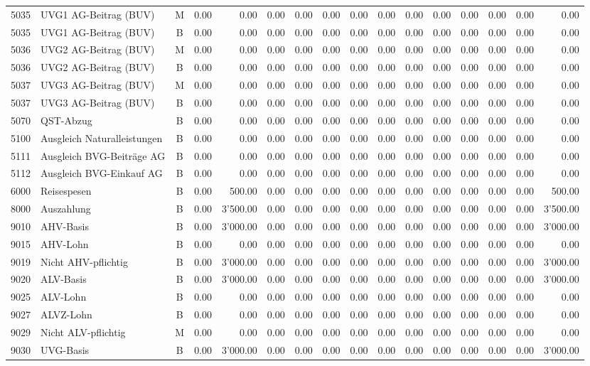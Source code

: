 \documentclass[8pt,a4paper]{extarticle}
\begin{document}
\begin{longtable}{@{\extracolsep{\fill}} l l c r r r r r r r r r r r r r}
5035&UVG1 AG-Beitrag (BUV)&M&0.00&0.00&0.00&0.00&0.00&0.00&0.00&0.00&0.00&0.00&0.00&0.00&0.00\\
5035&UVG1 AG-Beitrag (BUV)&B&0.00&0.00&0.00&0.00&0.00&0.00&0.00&0.00&0.00&0.00&0.00&0.00&0.00\\
5036&UVG2 AG-Beitrag (BUV)&M&0.00&0.00&0.00&0.00&0.00&0.00&0.00&0.00&0.00&0.00&0.00&0.00&0.00\\
5036&UVG2 AG-Beitrag (BUV)&B&0.00&0.00&0.00&0.00&0.00&0.00&0.00&0.00&0.00&0.00&0.00&0.00&0.00\\
5037&UVG3 AG-Beitrag (BUV)&M&0.00&0.00&0.00&0.00&0.00&0.00&0.00&0.00&0.00&0.00&0.00&0.00&0.00\\
5037&UVG3 AG-Beitrag (BUV)&B&0.00&0.00&0.00&0.00&0.00&0.00&0.00&0.00&0.00&0.00&0.00&0.00&0.00\\
5070&QST-Abzug&B&0.00&0.00&0.00&0.00&0.00&0.00&0.00&0.00&0.00&0.00&0.00&0.00&0.00\\
5100&Ausgleich Naturalleistungen&B&0.00&0.00&0.00&0.00&0.00&0.00&0.00&0.00&0.00&0.00&0.00&0.00&0.00\\
5111&Ausgleich BVG-Beiträge AG&B&0.00&0.00&0.00&0.00&0.00&0.00&0.00&0.00&0.00&0.00&0.00&0.00&0.00\\
5112&Ausgleich BVG-Einkauf AG&B&0.00&0.00&0.00&0.00&0.00&0.00&0.00&0.00&0.00&0.00&0.00&0.00&0.00\\
6000&Reisespesen&B&0.00&500.00&0.00&0.00&0.00&0.00&0.00&0.00&0.00&0.00&0.00&0.00&500.00\\
8000&Auszahlung&B&0.00&3'500.00&0.00&0.00&0.00&0.00&0.00&0.00&0.00&0.00&0.00&0.00&3'500.00\\
9010&AHV-Basis&B&0.00&3'000.00&0.00&0.00&0.00&0.00&0.00&0.00&0.00&0.00&0.00&0.00&3'000.00\\
9015&AHV-Lohn&B&0.00&0.00&0.00&0.00&0.00&0.00&0.00&0.00&0.00&0.00&0.00&0.00&0.00\\
9019&Nicht AHV-pflichtig&B&0.00&3'000.00&0.00&0.00&0.00&0.00&0.00&0.00&0.00&0.00&0.00&0.00&3'000.00\\
9020&ALV-Basis&B&0.00&3'000.00&0.00&0.00&0.00&0.00&0.00&0.00&0.00&0.00&0.00&0.00&3'000.00\\
9025&ALV-Lohn&B&0.00&0.00&0.00&0.00&0.00&0.00&0.00&0.00&0.00&0.00&0.00&0.00&0.00\\
9027&ALVZ-Lohn&B&0.00&0.00&0.00&0.00&0.00&0.00&0.00&0.00&0.00&0.00&0.00&0.00&0.00\\
9029&Nicht ALV-pflichtig&M&0.00&0.00&0.00&0.00&0.00&0.00&0.00&0.00&0.00&0.00&0.00&0.00&0.00\\
9030&UVG-Basis&B&0.00&3'000.00&0.00&0.00&0.00&0.00&0.00&0.00&0.00&0.00&0.00&0.00&3'000.00\\

\end{longtable}
\end{document}
